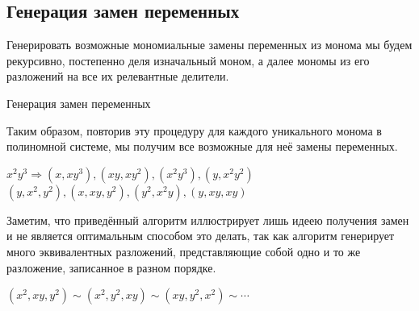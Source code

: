 \subsection{Генерация замен переменных} \label{sec:replacement-generation}

Генерировать возможные мономиальные замены переменных из монома мы будем рекурсивно, постепенно деля изначальный моном, а далее мономы из его разложений на все их релевантные делители.

\begin{algorithm}[H]
\SetAlgoLined
{}

\BlankLine
\BlankLine
{}
\caption{Генерация замен переменных} \label{algo:Replacement-Gen}
\end{algorithm}

Таким образом, повторив эту процедуру для каждого уникального монома в полиномной системе, мы получим все возможные для неё замены переменных. 

\begin{example}
    $x^2y^3 \Longrightarrow (x, xy^3), (xy, xy^2), (x^2 y^3), (y, x^2 y^2)$ \linebreak $(y, x^2, y^2), (x, xy, y^2), (y^2, x^2 y), (y, xy, xy)$
\end{example}

Заметим, что приведённый алгоритм иллюстрирует лишь идеею получения замен и не является оптимальным способом это делать, так как алгоритм генерирует много эквивалентных разложений, представляющие собой одно и то же разложение, записанное в разном порядке.
\begin{example}
    $(x^2, xy, y^2) \sim (x^2, y^2, xy) \sim (xy, y^2, x^2) \sim \cdots$
\end{example}

